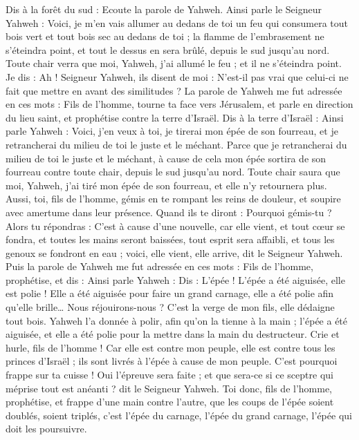 \begin{multicols}{2}
Dis à la forêt du sud : Ecoute la parole de Yahweh. Ainsi parle le Seigneur Yahweh : Voici, je m'en vais allumer au dedans de toi un feu qui consumera tout bois vert et tout bois sec au dedans de toi ; la flamme de l'embrasement ne s'éteindra point, et tout le dessus en sera brûlé, depuis le sud jusqu'au nord.
Toute chair verra que moi, Yahweh, j'ai allumé le feu ; et il ne s'éteindra point.
Je dis : Ah ! Seigneur Yahweh, ils disent de moi : N'est-il pas vrai que celui-ci ne fait que mettre en avant des similitudes ?
La parole de Yahweh me fut adressée en ces mots :
Fils de l'homme, tourne ta face vers Jérusalem, et parle en direction du lieu saint, et prophétise contre la terre d'Israël.
Dis à la terre d'Israël : Ainsi parle Yahweh : Voici, j'en veux à toi, je tirerai mon épée de son fourreau, et je retrancherai du milieu de toi le juste et le méchant.
Parce que je retrancherai du milieu de toi le juste et le méchant, à cause de cela mon épée sortira de son fourreau contre toute chair, depuis le sud jusqu'au nord.
Toute chair saura que moi, Yahweh, j'ai tiré mon épée de son fourreau, et elle n'y retournera plus.
Aussi, toi, fils de l'homme, gémis en te rompant les reins de douleur, et soupire avec amertume dans leur présence.
Quand ils te diront : Pourquoi gémis-tu ? Alors tu répondras : C'est à cause d'une nouvelle, car elle vient, et tout cœur se fondra, et toutes les mains seront baissées, tout esprit sera affaibli, et tous les genoux se fondront en eau ; voici, elle vient, elle arrive, dit le Seigneur Yahweh.
Puis la parole de Yahweh me fut adressée en ces mots :
Fils de l'homme, prophétise, et dis : Ainsi parle Yahweh : Dis : L'épée ! L'épée a été aiguisée, elle est polie !
Elle a été aiguisée pour faire un grand carnage, elle a été polie afin qu'elle brille… Nous réjouirons-nous ? C'est la verge de mon fils, elle dédaigne tout bois.
Yahweh l'a donnée à polir, afin qu'on la tienne à la main ; l'épée a été aiguisée, et elle a été polie pour la mettre dans la main du destructeur.
Crie et hurle, fils de l'homme ! Car elle est contre mon peuple, elle est contre tous les princes d'Israël ; ils sont livrés à l'épée à cause de mon peuple. C'est pourquoi frappe sur ta cuisse !
Oui l'épreuve sera faite ; et que sera-ce si ce sceptre qui méprise tout est anéanti ? dit le Seigneur Yahweh.
Toi donc, fils de l'homme, prophétise, et frappe d'une main contre l'autre, que les coups de l'épée soient doublés, soient triplés, c'est l'épée du carnage, l'épée du grand carnage, l'épée qui doit les poursuivre.

\end{multicols}
